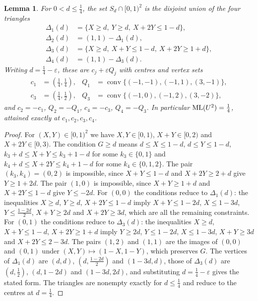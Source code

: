 \documentclass[12pt]{amsart}
\newtheorem{lemma}[theorem]{Lemma}
\theoremstyle{definition}\newtheorem{definition}[theorem]{Definition}
\theoremstyle{remark}\newtheorem{remark}[theorem]{Remark}
\newcommand{\ML}{\operatorname{ML}}
\begin{document}
\begin{lemma}\label{lem:U2cells}
For $0<d\le\frac14$, the set $S_d\cap[0,1)^2$ is the disjoint union of the four triangles
\begin{align*}
 \Delta_1(d)&=\{X\ge d,\ Y\ge d,\ X+2Y\le 1-d\},\\
 \Delta_2(d)&=(1,1)-\Delta_1(d),\\
 \Delta_3(d)&=\{X\ge d,\ X+Y\le 1-d,\ X+2Y\ge 1+d\},\\
 \Delta_4(d)&=(1,1)-\Delta_3(d).
\end{align*}
Writing $d=\frac14-\varepsilon$, these are $c_j+\varepsilon Q_j$ with centres and vertex sets
\begin{align*}
 c_1&=(\tfrac14,\tfrac14),& Q_1&=\operatorname{conv}\{(-1,-1),(-1,1),(3,-1)\},\\
 c_3&=(\tfrac14,\tfrac12),& Q_3&=\operatorname{conv}\{(-1,0),(-1,2),(3,-2)\},
\end{align*}
and $c_2=-c_1$, $Q_2=-Q_1$, $c_4=-c_3$, $Q_4=-Q_3$. In particular $\ML(\Utwo)=\frac14$, attained exactly at $c_1,c_2,c_3,c_4$.
\end{lemma}
\begin{proof}
For $(X,Y)\in[0,1)^2$ we have $X,Y\in[0,1)$, $X+Y\in[0,2)$ and $X+2Y\in[0,3)$. The condition $G\ge d$ means $d\le X\le 1-d$, $d\le Y\le 1-d$, $k_3+d\le X+Y\le k_3+1-d$ for some $k_3\in\{0,1\}$ and $k_4+d\le X+2Y\le k_4+1-d$ for some $k_4\in\{0,1,2\}$. The pair $(k_3,k_4)=(0,2)$ is impossible, since $X+Y\le 1-d$ and $X+2Y\ge 2+d$ give $Y\ge 1+2d$. The pair $(1,0)$ is impossible, since $X+Y\ge 1+d$ and $X+2Y\le 1-d$ give $Y\le-2d$. For $(0,0)$ the conditions reduce to $\Delta_1(d)$: the inequalities $X\ge d$, $Y\ge d$, $X+2Y\le 1-d$ imply $X+Y\le 1-2d$, $X\le 1-3d$, $Y\le\frac{1-2d}2$, $X+Y\ge 2d$ and $X+2Y\ge 3d$, which are all the remaining constraints. For $(0,1)$ the conditions reduce to $\Delta_3(d)$: the inequalities $X\ge d$, $X+Y\le1-d$, $X+2Y\ge 1+d$ imply $Y\ge 2d$, $Y\le 1-2d$, $X\le 1-3d$, $X+Y\ge 3d$ and $X+2Y\le 2-3d$. The pairs $(1,2)$ and $(1,1)$ are the images of $(0,0)$ and $(0,1)$ under $(X,Y)\mapsto(1-X,1-Y)$, which preserves $G$. The vertices of $\Delta_1(d)$ are $(d,d)$, $(d,\frac{1-2d}2)$ and $(1-3d,d)$, those of $\Delta_3(d)$ are $(d,\frac12)$, $(d,1-2d)$ and $(1-3d,2d)$, and substituting $d=\frac14-\varepsilon$ gives the stated form. The triangles are nonempty exactly for $d\le\frac14$ and reduce to the centres at $d=\frac14$.
\end{proof}
\end{document}
